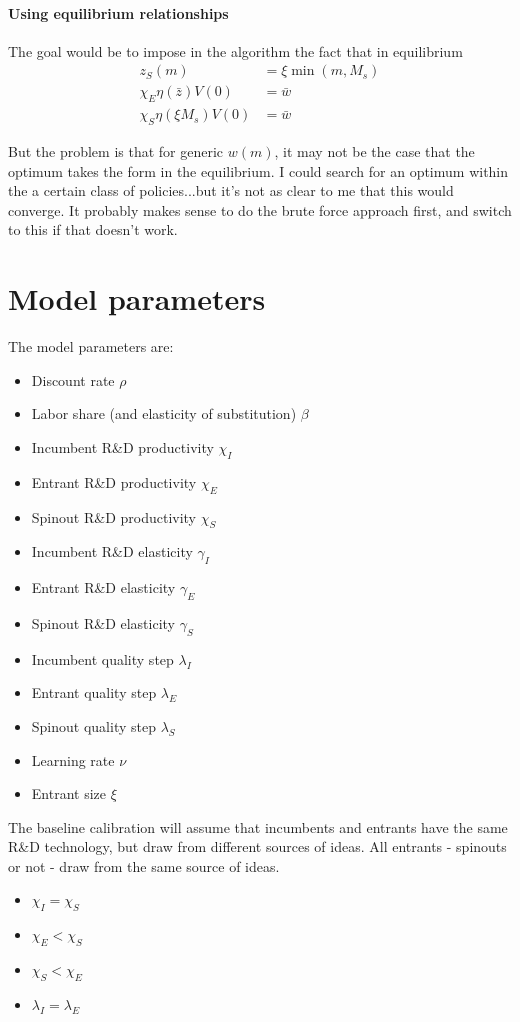 \documentclass[12pt,english]{article}
\theoremstyle{remark}
\begin{document}
\paragraph{Using equilibrium relationships}
The goal would be to impose in the algorithm the fact that in equilibrium 
\begin{align*}
z_S(m) &= \xi \min(m,M_s) \\
\chi_E \eta(\bar{z}) V(0) &= \bar{w} \\ 
\chi_S \eta(\xi M_s) V(0) &= \bar{w} 
\end{align*}

But the problem is that for generic $w(m)$, it may not be the case that the optimum takes the form in the equilibrium. I could search for an optimum within the a certain class of policies...but it's not as clear to me that this would converge. It probably makes sense to do the brute force approach first, and switch to this if that doesn't work.

\section{Model parameters}

The model parameters are:
\begin{itemize}
	\item Discount rate $\rho$
	\item Labor share (and elasticity of substitution) $\beta$
	\item Incumbent R\&D productivity $\chi_I$
	\item Entrant R\&D productivity $\chi_E$
	\item Spinout R\&D productivity $\chi_S$
	\item Incumbent R\&D elasticity $\gamma_I$
	\item Entrant R\&D elasticity $\gamma_E$
	\item Spinout R\&D elasticity $\gamma_S$
	\item Incumbent quality step $\lambda_I$
	\item Entrant quality step $\lambda_E$
	\item Spinout quality step $\lambda_S$
	\item Learning rate $\nu$
	\item Entrant size $\xi$
\end{itemize}

The baseline calibration will assume that incumbents and entrants have the same R\&D technology, but draw from different sources of ideas. All entrants - spinouts or not - draw from the same source of ideas.
\begin{itemize}
	\item $\chi_I = \chi_S$
	\item $\chi_E < \chi_S$
	\item $\chi_S < \chi_E$
	\item $\lambda_I = \lambda_E$
\end{itemize}
\end{document}
